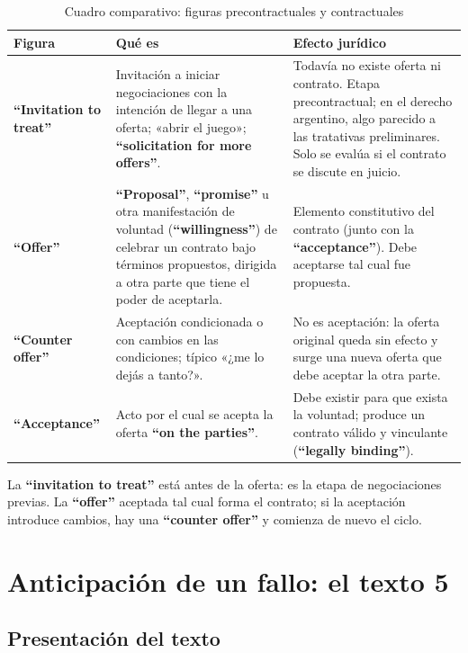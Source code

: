 \documentclass[12pt,oneside]{book}
\begin{document}
\begin{table}[H]
\centering
\caption{Cuadro comparativo: figuras precontractuales y contractuales}
\begin{tabularx}{\textwidth}{
    >{\raggedright\arraybackslash}p{}
    >{\raggedright\arraybackslash}X
    >{\raggedright\arraybackslash}X
}
\toprule
\textbf{Figura} & \textbf{Qué es} & \textbf{Efecto jurídico} \\
\midrule
\textbf{``Invitation to treat''} &
Invitación a iniciar negociaciones con la intención de llegar a una oferta; «abrir el juego»; \textbf{``solicitation for more offers''}. &
Todavía no existe oferta ni contrato. Etapa precontractual; en el derecho argentino, algo parecido a las tratativas preliminares. Solo se evalúa si el contrato se discute en juicio. \\
\textbf{``Offer''} &
\textbf{``Proposal''}, \textbf{``promise''} u otra manifestación de voluntad (\textbf{``willingness''}) de celebrar un contrato bajo términos propuestos, dirigida a otra parte que tiene el poder de aceptarla. &
Elemento constitutivo del contrato (junto con la \textbf{``acceptance''}). Debe aceptarse tal cual fue propuesta. \\
\textbf{``Counter offer''} &
Aceptación condicionada o con cambios en las condiciones; típico «¿me lo dejás a tanto?». &
No es aceptación: la oferta original queda sin efecto y surge una nueva oferta que debe aceptar la otra parte. \\
\textbf{``Acceptance''} &
Acto por el cual se acepta la oferta \textbf{``on the parties''}. &
Debe existir para que exista la voluntad; produce un contrato válido y vinculante (\textbf{``legally binding''}). \\
\bottomrule
\end{tabularx}
\end{table}

\begin{important}
La \textbf{``invitation to treat''} está antes de la oferta: es la etapa de negociaciones previas. La \textbf{``offer''} aceptada tal cual forma el contrato; si la aceptación introduce cambios, hay una \textbf{``counter offer''} y comienza de nuevo el ciclo.
\end{important}

\section{Anticipación de un fallo: el texto 5}

\subsection{Presentación del texto}
\end{document}
